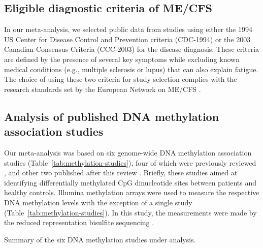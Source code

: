 \subsection{Eligible diagnostic criteria of ME/CFS}

In our meta-analysis, we selected public data from studies using either the 1994 US Center for Disease Control and Prevention criteria (CDC-1994) \citep{fukuda1994ChronicFatigue} or the 2003 Canadian Consensus Criteria (CCC-2003) \citep{carruthers2003MyalgicEncephalomyelitis} for the disease diagnosis. These criteria are defined by the presence of several key symptoms while excluding known medical conditions (e.g., multiple sclerosis or lupus) that can also explain fatigue. The choice of using these two criteria for study selection complies with the research standards set by the European Network on ME/CFS \citep{pheby2020DevelopmentConsistent}.

\subsection{Analysis of published DNA methylation association studies}

Our meta-analysis was based on six genome-wide DNA methylation association studies (Table~\ref{tab:methylation-studies}), four of which \citep{brenu2014MethylationProfile, vegaDNAMethylationModifications2014, vegaEpigeneticModificationsGlucocorticoid2017, trivedi2018IdentificationMyalgic} were previously reviewed \citep{almenar-perez2019EpigeneticComponents}, and other two published after this review \citep{herrera2018GenomeepigenomeInteractions, helliwell2020ChangesDNA}. Briefly, these studies aimed at identifying differentially methylated CpG dinucleotide sites between patients and healthy controls. Illumina methylation arrays were used to measure the respective DNA methylation levels with the exception of a single study (Table~\ref{tab:methylation-studies}). In this study, the measurements were made by the reduced representation bisulfite sequencing \citep{helliwell2020ChangesDNA}.

\begin{table}[h]
    \centering
    \caption[Summary of the six DNA methylation studies under analysis]{Summary of the six DNA methylation studies under analysis.}
    \resizebox{\textwidth}{!}{}
    \label{tab:methylation-studies}
\end{table}

